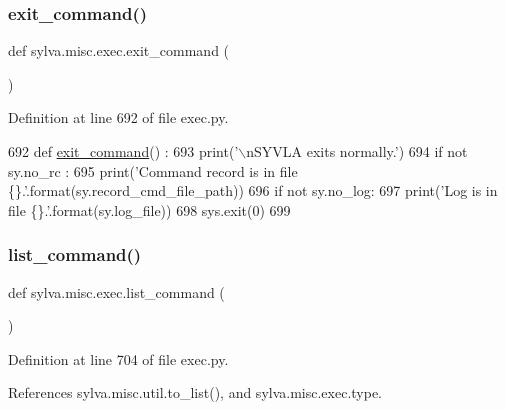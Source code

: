 \subsubsection{\texorpdfstring{exit\+\_\+command()}{exit\_command()}}
{\footnotesize\ttfamily def sylva.\+misc.\+exec.\+exit\+\_\+command (\begin{DoxyParamCaption}{ }\end{DoxyParamCaption})}



Definition at line 692 of file exec.\+py.


\begin{DoxyCode}
692 \textcolor{keyword}{def }\hyperlink{namespacesylva_1_1misc_1_1exec_afdee869cb32b6c18b9747718ac8dc475}{exit\_command}() :
693   print(\textcolor{stringliteral}{'\(\backslash\)nSYVLA exits normally.'})
694   \textcolor{keywordflow}{if} \textcolor{keywordflow}{not} sy.no\_rc :
695     print(\textcolor{stringliteral}{'Command record is in file \{\}.'}.format(sy.record\_cmd\_file\_path))
696   \textcolor{keywordflow}{if} \textcolor{keywordflow}{not} sy.no\_log:
697     print(\textcolor{stringliteral}{'Log is in file \{\}.'}.format(sy.log\_file))
698   sys.exit(0)
699 
\end{DoxyCode}
\mbox{\label{namespacesylva_1_1misc_1_1exec_af0ed98897004764988fba9af76290e90}} 
\subsubsection{\texorpdfstring{list\+\_\+command()}{list\_command()}}
{\footnotesize\ttfamily def sylva.\+misc.\+exec.\+list\+\_\+command (\begin{DoxyParamCaption}{ }\end{DoxyParamCaption})}



Definition at line 704 of file exec.\+py.



References sylva.\+misc.\+util.\+to\+\_\+list(), and sylva.\+misc.\+exec.\+type.


